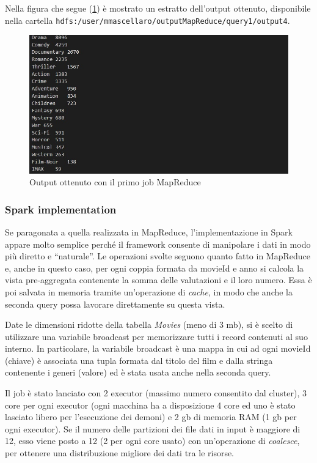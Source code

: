 \documentclass[10pt]{article}
\begin{document}
Nella figura che segue (\ref{Result1}) è mostrato un estratto dell'output ottenuto, disponibile nella cartella \texttt{hdfs:/user/mmascellaro/outputMapReduce/query1/output4}.

\begin{figure}[th]
	\centering
	\includegraphics[scale=0.60]{images/Result1.jpg}
	\caption{Output ottenuto con il primo job MapReduce}
	\label{Result1}
\end{figure}

\subsubsection{Spark implementation}

Se paragonata a quella realizzata in MapReduce, l'implementazione in Spark appare molto semplice perché il framework consente di manipolare i dati in modo più diretto e ``naturale''. Le operazioni svolte seguono quanto fatto in MapReduce e, anche in questo caso, per ogni coppia formata da movieId e anno si calcola la vista pre-aggregata contenente la somma delle valutazioni e il loro numero. Essa è poi salvata in memoria tramite un'operazione di \textit{cache}, in modo che anche la seconda query possa lavorare direttamente su questa vista.

Date le dimensioni ridotte della tabella \textit{Movies} (meno di 3 mb), si è scelto di utilizzare una variabile broadcast per memorizzare tutti i record contenuti al suo interno. In particolare, la variabile broadcast è una mappa in cui ad ogni movieId (chiave) è associata una tupla formata dal titolo del film e dalla stringa contenente i generi (valore) ed è stata usata anche nella seconda query.

Il job è stato lanciato con 2 executor (massimo numero consentito dal cluster), 3 core per ogni executor (ogni macchina ha a disposizione 4 core ed uno è stato lasciato libero per l'esecuzione dei demoni) e 2 gb di memoria RAM (1 gb per ogni executor). Se il numero delle partizioni dei file dati in input è maggiore di 12, esso viene posto a 12 (2 per ogni core usato) con un'operazione di \textit{coalesce}, per ottenere una distribuzione migliore dei dati tra le risorse.
\end{document}

